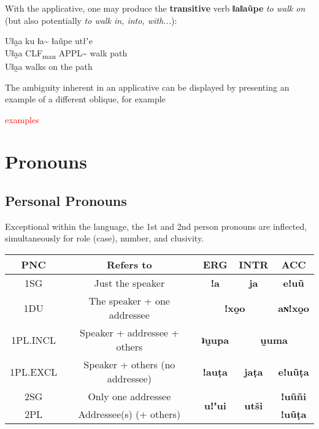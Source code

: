 \documentclass[11pt,a5paper]{book}
\newcommand{\qcn}[1]{\textcolor{AccentText}{\large\textbf{#1}}}
\newcommand{\transl}[2]{\qcn{#1} \emph{#2}}
\newcommand{\grammsc}[1]{\textsc{#1}}
\newcommand{\CLF}[1]{\grammsc{CLF}\textsubscript{#1}}
\newcommand{\ERG}{\grammsc{ERG}}
\newcommand{\ACC}{\grammsc{ACC}}
\newcommand{\INTR}{\grammsc{INTR}}
\newcommand{\cmnt}[1]{\textcolor{red}{#1}}
\begin{document}
With the applicative, one may produce the \textbf{transitive} verb \transl{ǁaǁaũpe}{to walk on} (but also potentially \transl{}{to walk in, into, with...}):

\begin{exe}
\ex
\gll Uǁa̰a ku ǁa\textasciitilde{} ǁaũpe utłʼe \\
Uǁa̰a \CLF{man} APPL\textasciitilde{} walk path \\
\glt Uǁa̰a walks on the path
\end{exe}

The ambiguity inherent in an applicative can be displayed by presenting an example of a different oblique, for example

\cmnt{examples}

\section{Pronouns}


\subsection{Personal Pronouns}

Exceptional within the language, the 1st and 2nd person pronouns are inflected, simultaneously for role (case), number, and clusivity.

\begin{center}
\begin{tabular}{|c|c|c|c|c|}
\hline
PNC & Refers to & \ERG & \INTR & \ACC \\ \hline \hline
1SG & Just the speaker &\qcn{ǃa} & \qcn{ja} & \qcn{eǃuũ}\\ \hline
1DU & The speaker + one addressee & \multicolumn{2}{c|}{\qcn{ǃxo̰o}} & \qcn{aɴǃxo̰o} \\ \hline
1PL.INCL & Speaker + addressee + others & \qcn{ʇṵupa} & \multicolumn{2}{c|}{\qcn{ṵuma}} \\ \hline
1PL.EXCL & Speaker + others (no addressee) &\qcn{ǃauṭa} & \qcn{jaṭa} & \qcn{eǃuũṭa}\\ \hline
2SG & Only one addressee &\multirow{2}{*}{\qcn{uǃʼui}} & \multirow{2}{*}{\qcn{utši}} & \qcn{ǃuũñi}\\ \cline{1-2} \cline{5-5}
2PL & Addressee(s) (+ others) &  &  & \qcn{ǃuũṭa}\\\hline
\end{tabular}
\end{center}
\end{document}
